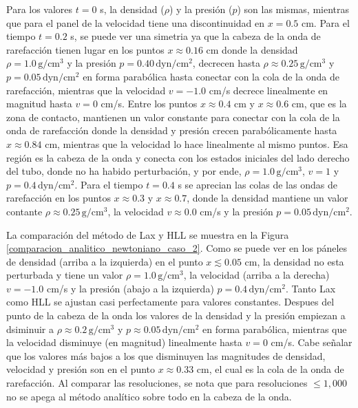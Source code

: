 \documentclass[12pt,a4paper]{book}
\begin{document}
Para los valores $t = 0$ s, la densidad ($\rho$) y la presión ($p$) son las mismas, 
mientras que para el panel de
la velocidad  tiene una discontinuidad en $x = 0.5$ cm. 
Para el tiempo $t = 0.2$ s, se puede ver una 
simetria ya que la cabeza de la onda de rarefacción tienen lugar en los puntos $x \approx 0.16$ cm
donde la densidad $\rho = 1.0 \,  \text{g}/ \text{cm}^3$ y 
la presión $p = 0.40 \,  \text{dyn}/ \text{cm}^2 $,
decrecen hasta $\rho \approx 0.25 \,  \text{g}/ \text{cm}^3$ y $p = 0.05 \,  \text{dyn}/ \text{cm}^2 $ en forma parabólica hasta conectar con la cola de 
la onda de rarefacción, mientras que la velocidad $v = -1.0 $ cm/s decrece linealmente en magnitud 
hasta $v = 0$ cm/s. Entre los puntos $x \approx 0.4$ cm y $x \approx 0.6$ cm, que es la zona de contacto, mantienen
un valor constante para conectar con la cola de la onda de rarefacción donde la densidad y presión 
crecen parabólicamente hasta $x \approx 0.84$ cm, mientras que la velocidad lo hace linealmente al mismo puntos.
Esa región es la cabeza de la onda y conecta con los estados iniciales del lado derecho del tubo, 
donde no ha habido perturbación, y por ende, $\rho = 1.0 \,  \text{g}/ \text{cm}^3$, 
$v = 1$ y $p = 0.4 \,  \text{dyn}/ \text{cm}^2 $.
Para el tiempo $t = 0.4$ s se aprecian las colas de las ondas de rarefacción
en los puntos $x  \approx 0.3$ y $x  \approx 0.7$, donde la densidad mantiene un valor contante 
$\rho \approx 0.25 \,  \text{g}/ \text{cm}^3$, la velocidad $v \approx 0.0$ cm/s y la presión $p = 0.05 \,  \text{dyn}/ \text{cm}^2 $.

La comparación del método de Lax y HLL se muestra en la Figura \ref{comparacion_analitico_newtoniano_caso_2}.
Como se puede ver en los páneles de densidad (arriba a la izquierda) en el punto $x \lesssim  0.05$ cm,
la densidad no esta perturbada y tiene un valor $\rho = 1.0 \,  \text{g}/ \text{cm}^3$,
la velocidad (arriba a la derecha)
$v = -1.0$ cm/s y la presión (abajo a la izquierda) $p = 0.4 \,  \text{dyn}/ \text{cm}^2 $. Tanto Lax como HLL 
se ajustan casi perfectamente 
para valores constantes. Despues del punto de la cabeza de la onda los valores de la densidad y 
la presión empiezan a dsiminuir a $\rho \approx 0.2 \,  \text{g}/ \text{cm}^3$ y 
$p \approx 0.05 \,  \text{dyn}/ \text{cm}^2 $
en forma parabólica, mientras que la velocidad disminuye (en magnitud) linealmente hasta $v = 0$ cm/s.
Cabe señalar que los valores más bajos a los que disminuyen las magnitudes de densidad, velocidad y 
presión son en el punto $x \approx 0.33$ cm, el cual es la cola de la onda de rarefacción. Al comparar
las resoluciones, se nota que para resoluciones $\leq 1,000$ no se apega al método analítico sobre 
todo en la cabeza de la onda.
\end{document}
